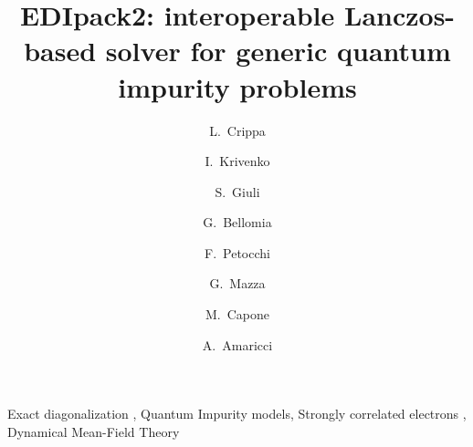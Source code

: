 \documentclass[preprint,3p,10pt]{elsarticle}
\begin{document}
\begin{frontmatter}

\title{EDIpack2: interoperable Lanczos-based solver for generic quantum impurity problems}
\author[a]{L.~Crippa}
\author[a]{I.~Krivenko}
\author[b]{S.~Giuli}
\author[b]{G.~Bellomia}
\author[d]{F.~Petocchi}
\author[e]{G.~Mazza}
\author[b]{M.~Capone}
\author[g]{A.~Amaricci}

\newcommand{\CNRIOM}{CNR-IOM, Istituto Officina dei Materiali,
  Consiglio Nazionale delle Ricerche, Via Bonomea 265, 34136
  Trieste, Italy}
\newcommand{\SISSA}{Scuola Internazionale Superiore di Studi Avanzati (SISSA),
  Via Bonomea 265, 34136 Trieste, Italy}
\newcommand{\ITPHamburg}{I. Institute of Theoretical Physics,
  University of Hamburg, Notkestrasse 9, 22607 Hamburg, Germany}
\newcommand{\WZBURG}{Institut f\"ur Theoretische Physik und
  Astrophysik,Universit\"at W\"urzburg, 97074 W\"urzburg, Germany}
\newcommand{\CTQMAT}{W\"urzburg-Dresden Cluster of Excellence ct.qmat, 01062 Dresden, Germany}
\newcommand{\Geneve}{Department of Quantum Matter Physics, University of
  Geneva, Quai Ernest-Ansermet 24, 1211 Geneva, Switzerland}
\newcommand{\UPISA}{Department of Physics ``E. Fermi'' University of
  Pisa, Largo B. Pontecorvo 3, 56127 Pisa, Italy}
\newcommand{\ESPCI}{LPEM, ESPCI Paris, PSL Research University, CNRS, Sorbonne Universit\'e, 75005 Paris, France}

\address[a]{\ITPHamburg}
\address[b]{\SISSA}
\address[c]{Politecnico di Torino, Turin, Italy}
\address[d]{\Geneve}
\address[e]{\UPISA}
\address[f]{\ESPCI}
\address[g]{\CNRIOM}

\begin{abstract}
  
\end{abstract}

\begin{keyword}
  Exact diagonalization \sep
  Quantum Impurity models\sep  
  Strongly correlated electrons \sep  
  Dynamical Mean-Field Theory
\end{keyword}

\end{frontmatter}
\end{document}
